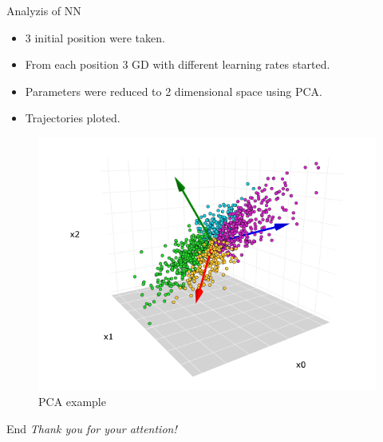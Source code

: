 \documentclass{beamer}
\begin{document}
\begin{frame}{Analyzis of NN}
	\begin{itemize}
		\item 3 initial position were taken.
		\item From each position 3 GD with different learning rates started.
		\item Parameters were reduced to 2 dimensional space using PCA.
		\item Trajectories ploted.
	\end{itemize}
	
	\begin{figure}
	\caption{PCA example}
	\includegraphics[scale=0.3]{pca}
	\end{figure}
\end{frame}

\begin{frame}{End}
	  \centering \Large
	  \emph{Thank you for your attention!}
\end{frame}
\end{document}
